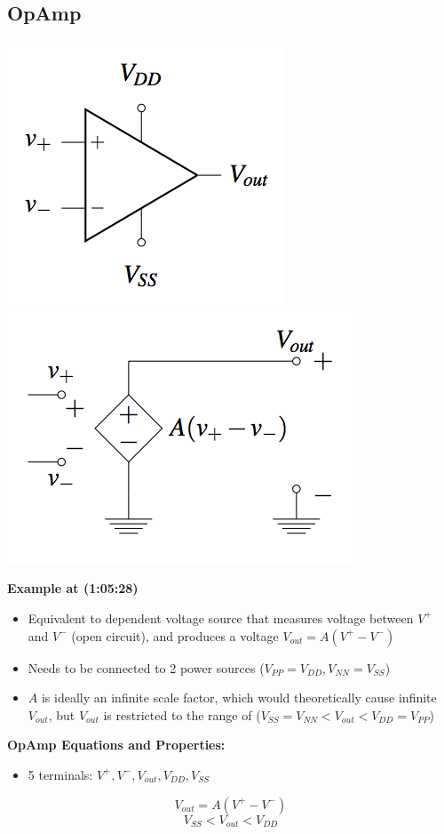 \documentclass{article}\usepackage{amsmath,amssymb,amsthm,tikz,tkz-graph,color,chngpage,soul,hyperref,csquotes,graphicx,floatrow}\newcommand*{\QEDB}{\hfill\ensuremath{\square}}\newtheorem*{prop}{Proposition}\renewcommand{\theenumi}{\alph{enumi}}\usepackage[shortlabels]{enumitem}\usepackage[nobreak=true]{mdframed}\usetikzlibrary{matrix,calc}\MakeOuterQuote{"}\usepackage[margin=0.75in]{geometry} \newtheorem{theorem}{Theorem}
\begin{document}
\subsection*{OpAmp}
\begin{center}\includegraphics{op}\includegraphics{opeq}\end{center}
\textbf{Example at (1:05:28)}
\begin{itemize}
    \item Equivalent to dependent voltage source that measures voltage between $V^+$ and $V^-$ (open circuit), and produces a voltage $V_{out}=A(V^{+}-V^{-})$
    \item Needs to be connected to 2 power sources ($V_{PP}=V_{DD}, V_{NN}=V_{SS}$)
    \item $A$ is ideally an infinite scale factor, which would theoretically cause infinite $V_{out}$, but $V_{out}$ is restricted to the range of ($V_{SS} = V_{NN} < V_{out} < V_{DD} = V_{PP}$)
\end{itemize}
\begin{mdframed}
\textbf{OpAmp Equations and Properties:}
\begin{itemize}
    \item 5 terminals: $V^+, V^-, V_{out}, V_{DD}, V_{SS}$
\end{itemize}
\begin{equation}V_{out}=A(V^{+}-V^{-})\end{equation}
\begin{equation}V_{SS} < V_{out} < V_{DD}\end{equation}
\end{mdframed}
\end{document}
